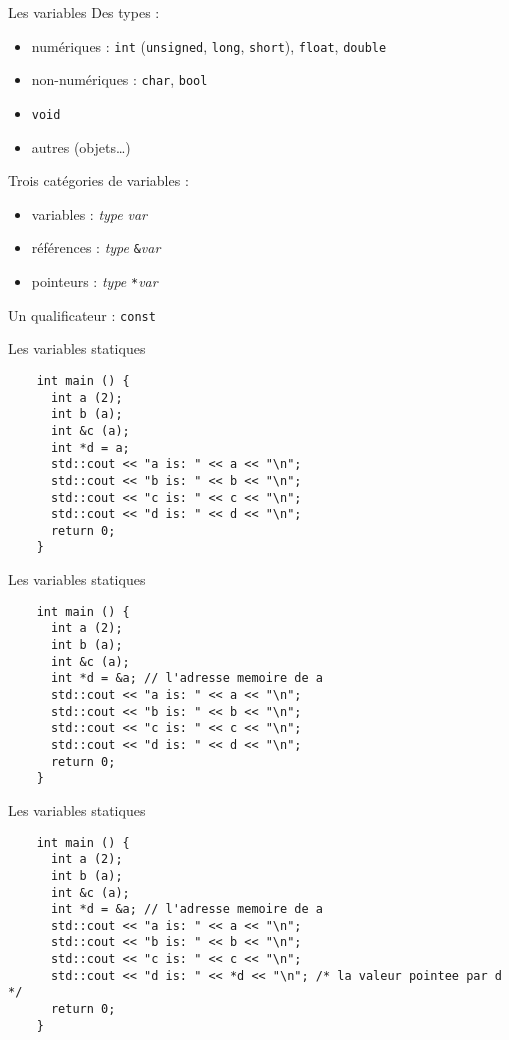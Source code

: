 \begin{frame}{Les variables}
  Des types :
  \begin{itemize}
  \item numériques : \texttt{int} (\texttt{unsigned}, \texttt{long}, \texttt{short}), \texttt{float}, \texttt{double}
  \item non-numériques : \texttt{char}, \texttt{bool}
  \item \texttt{void}
  \item autres (objets\dots{})
  \end{itemize}

  Trois catégories de variables :
  \begin{itemize}
  \item variables : \textit{type} \textit{var}
  \item références : \textit{type} \texttt{\&}\textit{var}
  \item pointeurs : \textit{type} \texttt{*}\textit{var}
  \end{itemize}

  Un qualificateur : \texttt{const}
\end{frame}

\begin{frame}[fragile]{Les variables statiques}
  \begin{lstlisting}
    int main () {
      int a (2);
      int b (a);
      int &c (a);
      int *d = a;
      std::cout << "a is: " << a << "\n";
      std::cout << "b is: " << b << "\n";
      std::cout << "c is: " << c << "\n";
      std::cout << "d is: " << d << "\n";
      return 0;
    }
  \end{lstlisting}
\end{frame}

\begin{frame}[fragile]{Les variables statiques}
  \begin{lstlisting}
    int main () {
      int a (2);
      int b (a);
      int &c (a);
      int *d = &a; // l'adresse memoire de a
      std::cout << "a is: " << a << "\n";
      std::cout << "b is: " << b << "\n";
      std::cout << "c is: " << c << "\n";
      std::cout << "d is: " << d << "\n";
      return 0;
    }
  \end{lstlisting}
\end{frame}

\begin{frame}[fragile]{Les variables statiques}
  \begin{lstlisting}
    int main () {
      int a (2);
      int b (a);
      int &c (a);
      int *d = &a; // l'adresse memoire de a
      std::cout << "a is: " << a << "\n";
      std::cout << "b is: " << b << "\n";
      std::cout << "c is: " << c << "\n";
      std::cout << "d is: " << *d << "\n"; /* la valeur pointee par d */
      return 0;
    }
  \end{lstlisting}
\end{frame}


